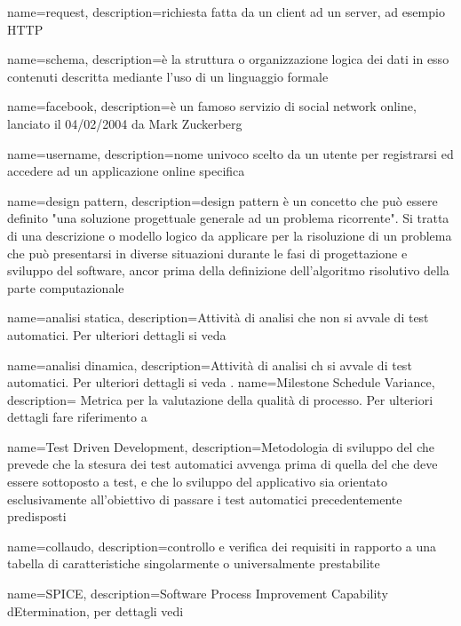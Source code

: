  {
	name=request,
	description={richiesta fatta da un client ad un server, ad esempio HTTP}
}

 {
	name=schema,
	description={è la struttura o organizzazione logica dei dati in esso contenuti descritta mediante l'uso di un linguaggio formale}
}

 {
	name=facebook,
	description={è un famoso servizio di social network online, lanciato il 04/02/2004 da Mark Zuckerberg}
}

 {
	name=username,
	description={nome univoco scelto da un utente per registrarsi ed accedere ad un applicazione online specifica}
}

 {
	name=design pattern,
	description={design pattern è un concetto che può essere definito "una soluzione progettuale generale ad un problema ricorrente". Si tratta di una descrizione o modello logico da applicare per la risoluzione di un problema che può presentarsi in diverse situazioni durante le fasi di progettazione e sviluppo del software, ancor prima della definizione dell'algoritmo risolutivo della parte computazionale}
}

 {
	name=analisi statica,
	description={Attività di analisi che non si avvale di test automatici. Per ulteriori dettagli si veda \Pdq{}}
}


 {
	name=analisi dinamica,
	description={Attività di analisi ch si avvale di test automatici. Per ulteriori dettagli si veda \Pdq{}.}
}
 {
	name=Milestone Schedule Variance,
	description={ Metrica per la valutazione della qualità di processo. Per ulteriori dettagli fare riferimento a \PdQ{}}
}

 {
	name=Test Driven Development,
	description={Metodologia di sviluppo del  che prevede che la stesura dei test automatici avvenga prima di quella del  che deve essere sottoposto a  test, e che lo sviluppo del  applicativo sia orientato esclusivamente all'obiettivo di passare i test automatici precedentemente predisposti}
}

 {
	name=collaudo,
	description={controllo e verifica dei requisiti in rapporto a una tabella di caratteristiche singolarmente o universalmente prestabilite}
}

 {
	name=SPICE,
	description={Software Process Improvement Capability
		dEtermination, per dettagli vedi \PdQ}
}

